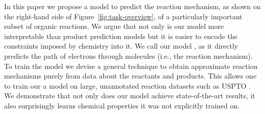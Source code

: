 In this paper we propose a model to predict the reaction mechanism, as shown on the right-hand side of Figure~\ref{fig:task-overview}, of a particularly important subset of organic reactions.
We argue that not only is our model more interpretable than product prediction models but it is easier to encode the constraints imposed by chemistry into it. 
We call our model \ourModel, as it directly predicts the path of electrons through molecules (i.e., the reaction mechanism). To train the model we devise a general technique to obtain approximate reaction mechanisms purely from data about the reactants and products. This allows one to train our a model on large, unannotated reaction datasets such as USPTO \cite{lowe2012extraction}. We demonstrate that not only does our model achieve state-of-the-art results, it also surprisingly learns chemical properties it was not explicitly trained on.



